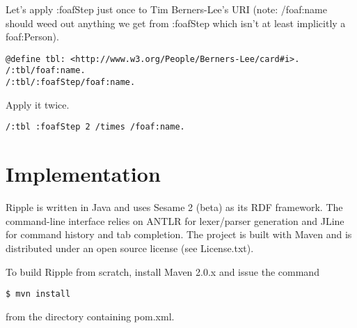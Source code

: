 \documentclass[runningheads]{llncs}
\begin{document}
Let's apply :foafStep just once to Tim Berners-Lee's URI (note: /foaf:name should weed out anything we get from :foafStep which isn't at least implicitly a foaf:Person).

\begin{verbatim}
@define tbl: <http://www.w3.org/People/Berners-Lee/card#i>.
/:tbl/foaf:name.
/:tbl/:foafStep/foaf:name.
\end{verbatim}

Apply it twice.

\begin{verbatim}
/:tbl :foafStep 2 /times /foaf:name.
\end{verbatim}

\section{Implementation}

Ripple is written in Java and uses Sesame 2 (beta) as its RDF framework.  The
command-line interface relies on ANTLR for lexer/parser generation and JLine for
command history and tab completion.  The project is built with Maven and is
distributed under an open source license (see License.txt).

To build Ripple from scratch, install Maven 2.0.x and issue the command

\begin{verbatim}
$ mvn install
\end{verbatim}

from the directory containing pom.xml.
\end{document}
